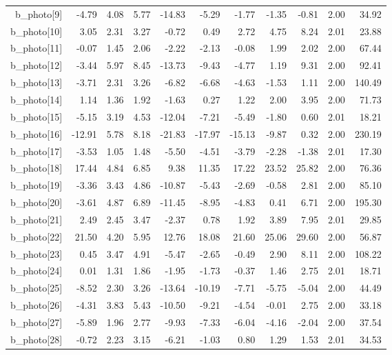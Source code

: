 \documentclass[11pt]{article}
\begin{document}
\begin{table}[ht]
\begin{tabular}{rrrrrrrrrrr}
  b\_photo[9] & -4.79 & 4.08 & 5.77 & -14.83 & -5.29 & -1.77 & -1.35 & -0.81 & 2.00 & 34.92 \\ 
  b\_photo[10] & 3.05 & 2.31 & 3.27 & -0.72 & 0.49 & 2.72 & 4.75 & 8.24 & 2.01 & 23.88 \\ 
  b\_photo[11] & -0.07 & 1.45 & 2.06 & -2.22 & -2.13 & -0.08 & 1.99 & 2.02 & 2.00 & 67.44 \\ 
  b\_photo[12] & -3.44 & 5.97 & 8.45 & -13.73 & -9.43 & -4.77 & 1.19 & 9.31 & 2.00 & 92.41 \\ 
  b\_photo[13] & -3.71 & 2.31 & 3.26 & -6.82 & -6.68 & -4.63 & -1.53 & 1.11 & 2.00 & 140.49 \\ 
  b\_photo[14] & 1.14 & 1.36 & 1.92 & -1.63 & 0.27 & 1.22 & 2.00 & 3.95 & 2.00 & 71.73 \\ 
  b\_photo[15] & -5.15 & 3.19 & 4.53 & -12.04 & -7.21 & -5.49 & -1.80 & 0.60 & 2.01 & 18.21 \\ 
  b\_photo[16] & -12.91 & 5.78 & 8.18 & -21.83 & -17.97 & -15.13 & -9.87 & 0.32 & 2.00 & 230.19 \\ 
  b\_photo[17] & -3.53 & 1.05 & 1.48 & -5.50 & -4.51 & -3.79 & -2.28 & -1.38 & 2.01 & 17.30 \\ 
  b\_photo[18] & 17.44 & 4.84 & 6.85 & 9.38 & 11.35 & 17.22 & 23.52 & 25.82 & 2.00 & 76.36 \\ 
  b\_photo[19] & -3.36 & 3.43 & 4.86 & -10.87 & -5.43 & -2.69 & -0.58 & 2.81 & 2.00 & 85.10 \\ 
  b\_photo[20] & -3.61 & 4.87 & 6.89 & -11.45 & -8.95 & -4.83 & 0.41 & 6.71 & 2.00 & 195.30 \\ 
  b\_photo[21] & 2.49 & 2.45 & 3.47 & -2.37 & 0.78 & 1.92 & 3.89 & 7.95 & 2.01 & 29.85 \\ 
  b\_photo[22] & 21.50 & 4.20 & 5.95 & 12.76 & 18.08 & 21.60 & 25.06 & 29.60 & 2.00 & 56.87 \\ 
  b\_photo[23] & 0.45 & 3.47 & 4.91 & -5.47 & -2.65 & -0.49 & 2.90 & 8.11 & 2.00 & 108.22 \\ 
  b\_photo[24] & 0.01 & 1.31 & 1.86 & -1.95 & -1.73 & -0.37 & 1.46 & 2.75 & 2.01 & 18.71 \\ 
  b\_photo[25] & -8.52 & 2.30 & 3.26 & -13.64 & -10.19 & -7.71 & -5.75 & -5.04 & 2.00 & 44.49 \\ 
  b\_photo[26] & -4.31 & 3.83 & 5.43 & -10.50 & -9.21 & -4.54 & -0.01 & 2.75 & 2.00 & 33.18 \\ 
  b\_photo[27] & -5.89 & 1.96 & 2.77 & -9.93 & -7.33 & -6.04 & -4.16 & -2.04 & 2.00 & 37.54 \\ 
  b\_photo[28] & -0.72 & 2.23 & 3.15 & -6.21 & -1.03 & 0.80 & 1.29 & 1.53 & 2.01 & 34.53 \\ 

\end{tabular}
\end{table}
\end{document}
